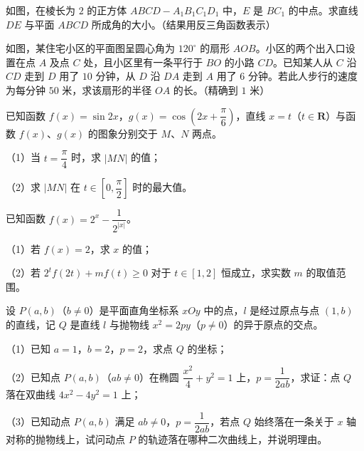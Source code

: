 \Needspace{0.4\textheight}
\begingroup
\renewenvironment{question}{\Needspace{0.44\textheight}}{}
\begin{question}
如图，在棱长为 $2$ 的正方体 $ABCD-A_1B_1C_1D_1$ 中，$E$ 是 $BC_1$ 的中点。求直线 $DE$ 与平面 $ABCD$ 所成角的大小。（结果用反三角函数表示）
\nopagebreak[4]
\begin{center}\end{center}
\nopagebreak[4]
\Needspace{0.4\textheight}
\end{question}
\endgroup
\begin{question}
如图，某住宅小区的平面图呈圆心角为 $120^\circ$ 的扇形 $AOB$。小区的两个出入口设置在点 $A$ 及点 $C$ 处，且小区里有一条平行于 $BO$ 的小路 $CD$。已知某人从 $C$ 沿 $CD$ 走到 $D$ 用了 $10$ 分钟，从 $D$ 沿 $DA$ 走到 $A$ 用了 $6$ 分钟。若此人步行的速度为每分钟 $50$ 米，求该扇形的半径 $OA$ 的长。（精确到 $1$ 米）
\nopagebreak[4]
\begin{center}\end{center}
\nopagebreak[4]
\end{question}
\begin{question}
已知函数 $f(x)=\sin2x$，$g(x)=\cos\left(2x+\dfrac{\pi}6\right)$，直线 $x=t$（$t\in\mathbf R$）与函数 $f(x)$、$g(x)$ 的图象分别交于 $M$、$N$ 两点。

（1）当 $t=\dfrac{\pi}4$ 时，求 $|MN|$ 的值；

（2）求 $|MN|$ 在 $t\in\left[0,\dfrac{\pi}2\right]$ 时的最大值。

\end{question}
\begin{question}
已知函数 $f(x)=2^x-\dfrac1{2^{|x|}}$。

（1）若 $f(x)=2$，求 $x$ 的值；

（2）若 $2^tf(2t)+mf(t)\geqslant0$ 对于 $t\in[1,2]$ 恒成立，求实数 $m$ 的取值范围。

\end{question}
\begin{question}
设 $P(a,b)$（$b\neq0$）是平面直角坐标系 $xOy$ 中的点，$l$ 是经过原点与点 $(1,b)$ 的直线，记 $Q$ 是直线 $l$ 与抛物线 $x^2=2py$（$p\neq0$）的异于原点的交点。

（1）已知 $a=1$，$b=2$，$p=2$，求点 $Q$ 的坐标；

（2）已知点 $P(a,b)$（$ab\neq0$）在椭圆 $\dfrac{x^2}4+y^2=1$ 上，$p=\dfrac1{2ab}$，求证：点 $Q$ 落在双曲线 $4x^2-4y^2=1$ 上；

（3）已知动点 $P(a,b)$ 满足 $ab\neq0$，$p=\dfrac1{2ab}$，若点 $Q$ 始终落在一条关于 $x$ 轴对称的抛物线上，试问动点 $P$ 的轨迹落在哪种二次曲线上，并说明理由。

\end{question}
